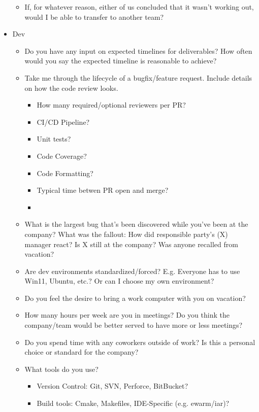 \documentclass{article}
\begin{document}
\begin{itemize}
\begin{itemize}
      \item If, for whatever reason, either of us concluded that it wasn't working out, would I be able to transfer to another team?
    \end{itemize}
  \item Dev
    \begin{itemize}
      \item Do you have any input on expected timelines for deliverables? How often would you say the expected timeline is reasonable to achieve?
      \item Take me through the lifecycle of a bugfix/feature request. Include details on how the code review looks.
        \begin{itemize}
          \item How many required/optional reviewers per PR?
          \item CI/CD Pipeline?
          \item Unit tests?
          \item Code Coverage?
          \item Code Formatting?
          \item Typical time betwen PR open and merge?
          \item
        \end{itemize}
      \item What is the largest bug that's been discovered while you've been at the company? What was the fallout: How did responsible party's (X) manager react? Is X still at the company? Was anyone recalled from vacation?
      \item Are dev environments standardized/forced? E.g. Everyone has to use Win11, Ubuntu, etc.? Or can I choose my own environment?
      \item Do you feel the desire to bring a work computer with you on vacation?
      \item How many hours per week are you in meetings? Do you think the company/team would be better served to have more or less meetings?
      \item Do you spend time with any coworkers outside of work? Is this a personal choice or standard for the company?
      \item What tools do you use?
        \begin{itemize}
          \item Version Control: Git, SVN, Perforce, BitBucket?
          \item Build tools: Cmake, Makefiles, IDE-Specific (e.g. ewarm/iar)?

\end{itemize}
\end{itemize}
\end{itemize}
\end{document}
